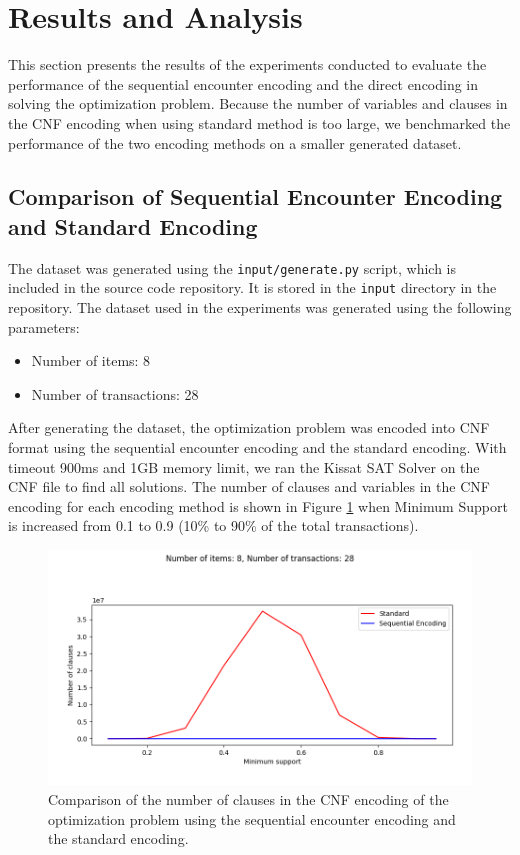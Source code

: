 \section{Results and Analysis}
This section presents the results of the experiments conducted to evaluate the performance of the sequential encounter encoding and the direct encoding in solving the optimization problem.
Because the number of variables and clauses in the CNF encoding when using standard method is too large, we benchmarked the performance of the two encoding methods on a smaller generated dataset.

\subsection{Comparison of Sequential Encounter Encoding and Standard Encoding}

The dataset was generated using the \texttt{input/generate.py} script, which is included in the source code repository.
It is stored in the \texttt{input} directory in the repository.
The dataset used in the experiments was generated using the following parameters:
\begin{itemize}
    \item Number of items: 8
    \item Number of transactions: 28
\end{itemize}

After generating the dataset, the optimization problem was encoded into CNF format using the sequential encounter encoding and the standard encoding.
With timeout 900ms and 1GB memory limit, we ran the Kissat SAT Solver on the CNF file to find all solutions.
The number of clauses and variables in the CNF encoding for each encoding method is shown in Figure \ref{fig:4_1} when Minimum Support is increased from 0.1 to 0.9 (10\% to 90\% of the total transactions).

\begin{figure}[H]
    \centering
    \includegraphics[width=1\textwidth]{chapter4/image/n_trans_28_clauses.png}
    \caption{Comparison of the number of clauses in the CNF encoding of the optimization problem using the sequential encounter encoding and the standard encoding.}
    \label{fig:4_1}
\end{figure}

